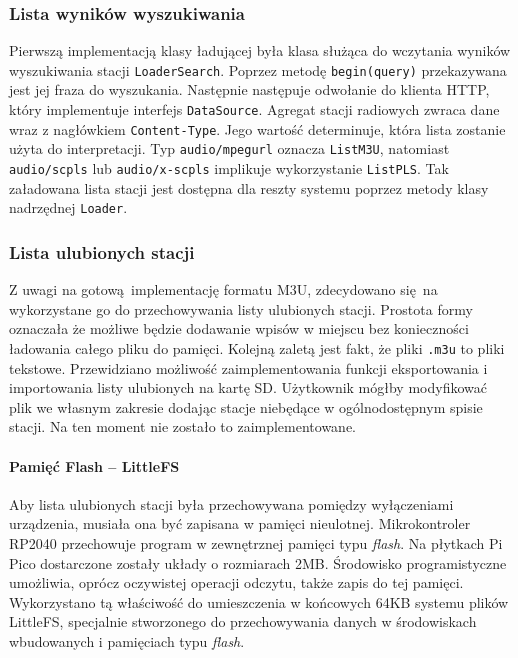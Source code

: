 \documentclass[12pt]{report}
\begin{document}
			\subsubsection{Lista wyników wyszukiwania}
				Pierwszą implementacją klasy ładującej była klasa służąca do wczytania wyników wyszukiwania stacji \lstinline|LoaderSearch|. Poprzez metodę \lstinline|begin(query)| przekazywana jest jej fraza do wyszukania. Następnie następuje odwołanie do klienta HTTP, który implementuje interfejs \lstinline|DataSource|. Agregat stacji radiowych zwraca dane wraz z nagłówkiem \lstinline|Content-Type|. Jego wartość determinuje, która lista zostanie użyta do interpretacji. Typ \lstinline|audio/mpegurl| oznacza \lstinline|ListM3U|, natomiast \lstinline|audio/scpls| lub \lstinline|audio/x-scpls| implikuje wykorzystanie \lstinline|ListPLS|. Tak załadowana lista stacji jest dostępna dla reszty systemu poprzez metody klasy nadrzędnej \lstinline|Loader|.
			
			\subsubsection{Lista ulubionych stacji}
				Z uwagi na gotową implementację formatu M3U, zdecydowano się na wykorzystane go do przechowywania listy ulubionych stacji. Prostota formy oznaczała że możliwe będzie dodawanie wpisów w miejscu bez konieczności ładowania całego pliku do pamięci. Kolejną zaletą jest fakt, że pliki \lstinline|.m3u| to pliki tekstowe. Przewidziano możliwość zaimplementowania funkcji eksportowania i importowania listy ulubionych na kartę SD. Użytkownik mógłby modyfikować plik we własnym zakresie dodając stacje niebędące w ogólnodostępnym spisie stacji. Na ten moment nie zostało to zaimplementowane.
			
				\paragraph{Pamięć Flash -- LittleFS}
					Aby lista ulubionych stacji była przechowywana pomiędzy wyłączeniami urządzenia, musiała ona być zapisana w pamięci nieulotnej. Mikrokontroler RP2040 przechowuje program w zewnętrznej pamięci typu \textit{flash}. Na płytkach Pi Pico dostarczone zostały układy o rozmiarach 2MB. Środowisko programistyczne umożliwia, oprócz oczywistej operacji odczytu, także zapis do tej pamięci. Wykorzystano tą właściwość do umieszczenia w końcowych 64KB systemu plików LittleFS\textsuperscript{\cite{littlefs}}, specjalnie stworzonego do przechowywania danych w środowiskach wbudowanych i pamięciach typu \textit{flash}.
			
\end{document}
